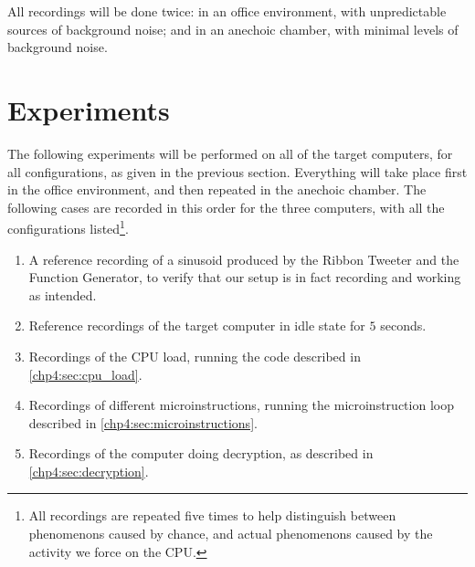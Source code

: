 All recordings will be done twice: in an office environment, with unpredictable sources of background noise; and in an anechoic chamber, with minimal levels of background noise.

\section{Experiments}

The following experiments will be performed on all of the target computers, for all configurations, as given in the previous section.
Everything will take place first in the office environment, and then repeated in the anechoic chamber. The following cases are recorded in this order for the three computers, with all the configurations listed\footnote{All recordings are repeated five times to help distinguish between phenomenons caused by chance, and actual phenomenons caused by the activity we force on the CPU.}.

\begin{enumerate}
	\item A reference recording of a sinusoid produced by the Ribbon Tweeter and the Function Generator, to verify that our setup is in fact recording and working as intended.
	\item Reference recordings of the target computer in idle state for $5$ seconds.
	\item Recordings of the CPU load, running the code described in \autoref{chp4:sec:cpu_load}.
	\item Recordings of different microinstructions, running the microinstruction loop described in \autoref{chp4:sec:microinstructions}.
	\item Recordings of the computer doing decryption, as described in \autoref{chp4:sec:decryption}. 
\end{enumerate}